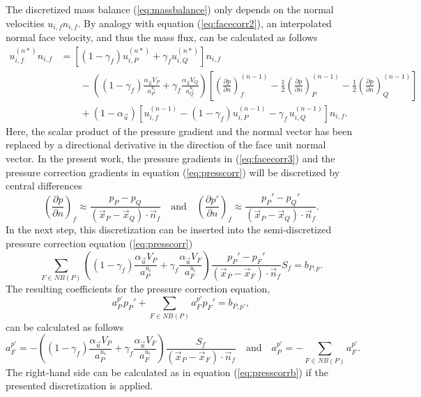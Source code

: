 The discretized mass balance (\ref{eq:massbalance}) only depends on the normal velocities \(u_{i,f} n_{i,f}\). By analogy with equation (\ref{eq:facecorr2}), an interpolated normal face velocity, and thus the mass flux, can be calculated as follows
\begin{align}
  \label{eq:facecorr3}
  u_{i,f}^{(n*)} n_{i,f}
  &=
  \left[\left(1 - \gamma_f\right) u_{i,P}^{(n*)} + \gamma_f u_{i,Q}^{(n*)} \right]n_{i,f} \nonumber\\[1em]
  &\quad\quad - 
  \left(\left(1 - \gamma_f\right) \frac{\alpha_\vec{u} V_P}{a_P^{u_i}} + \gamma_f \frac{\alpha_\vec{u} V_Q}{a_Q^{u_i}}\right)
  \left[ 
  \left(\frac{\partial p}{\partial n}\right)_f^{(n-1)} 
  -  \frac{1}{2} \left( \frac{\partial p}{\partial n} \right)_P^{(n-1)} 
  -  \frac{1}{2} \left(\frac{\partial p}{\partial n}\right)_Q^{(n-1)} 
\right] \nonumber \\[1em]
&\quad\quad + \left(1 - \alpha_\vec{u}\right) \left[ u_{i,f}^{(n-1)} - \left(1 - \gamma_f\right) u_{i,P}^{(n-1)} - \gamma_f \, u_{i,Q}^{(n-1)} \right] n_{i,f}.
\end{align}
Here, the scalar product of the pressure gradient and the normal vector has been replaced by a directional derivative in the direction of the face unit normal vector. In the present work, the pressure gradients in (\ref{eq:facecorr3}) and the pressure correction gradients in equation (\ref{eq:presscorr}) will be discretized by central differences
\begin{displaymath}
\left(\frac{\partial p}{\partial n}\right)_f \approx \frac{p_P - p_Q}{\left(\vec{x}_P - \vec{x}_Q\right)\cdot \vec{n}_f} 
\quad \text{and} \quad 
\left(\frac{\partial p'}{\partial n}\right)_f \approx \frac{p_P' - p_Q'}{\left(\vec{x}_P - \vec{x}_Q\right)\cdot \vec{n}_f}.
\end{displaymath}
In the next step, this discretization can be inserted into the semi-discretized pressure correction equation (\ref{eq:presscorr}) 
\begin{displaymath}
  \sum_{F \in NB(P)} \left(\left(1 - \gamma_f\right) \frac{\alpha_\vec{u} V_P}{a_P^{u_i}} + \gamma_f \frac{\alpha_\vec{u} V_F}{a_F^{u_i}}\right)
   \frac{p_P' - p_F'}{\left(\vec{x}_P - \vec{x}_F\right)\cdot \vec{n}_f} S_f
  = b_{P,p}.
\end{displaymath}
The resulting coefficients for the pressure correction equation,
\begin{displaymath}
  a_P^{p'} p_{P}' + \sum_{F \in NB(P)} a_F^{p'} p_{F}' = b_{P,p'},
\end{displaymath}
can be calculated as follows
\begin{equation}
  \label{eq:segpresscorrcoeff}
  a_F^{p'} = -\left(\left(1 - \gamma_f\right) \frac{\alpha_\vec{u} V_P}{a_P^{u_i}} + \gamma_f \frac{\alpha_\vec{u} V_F}{a_F^{u_i}}\right) \frac{S_f}{\left(\vec{x}_P - \vec{x}_F\right) \cdot \vec{n}_f} \quad \text{and} \quad
  a_P^{p'} = - \sum_{F \in NB(P)} a_F^{p'}.
\end{equation}
The right-hand side can be calculated as in equation (\ref{eq:presscorrb}) if the presented discretization is applied. 

